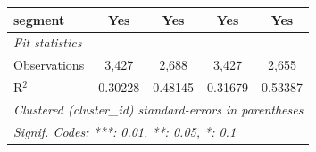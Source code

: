 \begin{tabular}{lcccc}
   segment                                       & Yes            & Yes             & Yes            & Yes\\  
   \midrule
   \emph{Fit statistics}\\
   Observations                                  & 3,427          & 2,688           & 3,427          & 2,655\\  
   R$^2$                                         & 0.30228        & 0.48145         & 0.31679        & 0.53387\\  
   \midrule \midrule
   \multicolumn{5}{l}{\emph{Clustered (cluster\_id) standard-errors in parentheses}}\\
   \multicolumn{5}{l}{\emph{Signif. Codes: ***: 0.01, **: 0.05, *: 0.1}}\\
\end{tabular}
\par\endgroup


